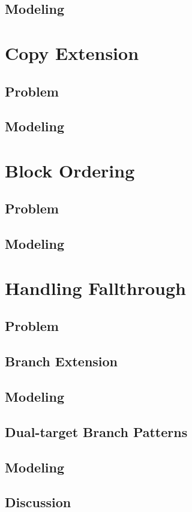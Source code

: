 \documentclass{kthdiss}
\begin{document}
\section{Modeling}

\chapter{Copy Extension}
\section{Problem}
\section{Modeling}

\chapter{Block Ordering}
\section{Problem}
\section{Modeling}

\chapter{Handling Fallthrough}
\section{Problem}
\section{Branch Extension}
\section{Modeling}
\section{Dual-target Branch Patterns}
\section{Modeling}
\section{Discussion}
\end{document}
